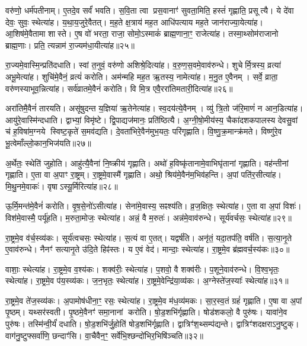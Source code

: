वरु॑णो॒ धर्म॑पतीनाम्।
ए॒तदे॒व सर्वं॑ भवति।
स॒वि॒ता त्वा प्रस॒वानाꣳ॑ सुवता॒मिति॒ हस्तं॑ गृह्णाति॒ प्रसूत्यै।
ये दे॑वा देवः॒ सुवः॒ स्थेत्या॑ह।
य॒था॒य॒जुरे॒वैतत्।
म॒ह॒ते क्ष॒त्राय॑ मह॒त आधि॑पत्याय मह॒ते जान॑राज्या॒येत्या॑ह।
आ॒शिष॑मे॒वैतामा शास्ते।
ए॒ष वो॑ भरता॒ राजा॒ सोमो॒\-ऽस्माकं॑ ब्राह्म॒णाना॒ꣳ॒ राजेत्या॑ह।
तस्मा॒थ्सोम॑राजानो ब्राह्म॒णाः।
प्रति॒ त्यन्नाम॑ रा॒ज्यम॑धा॒यीत्या॑ह॥२५॥

रा॒ज्यमे॒वास्मि॒न्प्रति॑दधाति।
स्वां त॒नुवं॒ वरु॑णो अशिश्रे॒दि\-त्या॑ह।
व॒रु॒ण॒स॒वमे॒वाव॑रुन्धे।
शुचेर्मि॒त्रस्य॒ व्रत्या॑ अभू॒मेत्या॑ह।
शुचि॑मे॒वैनं॒ व्रत्यं॑ करोति।
अम॑न्महि मह॒त ऋ॒तस्य॒ नामेत्या॑ह।
म॒नु॒त ए॒वैनम्।
सर्वे॒ व्राता॒ वरु॑णस्याभूव॒न्नित्या॑ह।
सर्व॑व्रातमे॒वैनं॑ करोति।
वि मि॒त्र एवै॒ररा॑तिमतारी॒दित्या॑ह॥२६॥

अरा॑तिमै॒वैनं॑ तारयति।
असू॑षुदन्त य॒ज्ञिया॑ ऋ॒तेनेत्या॑ह।
स्व॒दय॑त्ये॒वैनम्।
व्यु॑ त्रि॒तो ज॑रि॒माणं॑ न आन॒डित्या॑ह।
आयु॑रे॒वास्मि॑न्दधाति।
द्वाभ्यां॒ विमृ॑ष्टे।
द्वि॒पाद्यज॑मानः॒ प्रति॑ष्ठित्यै।
अ॒ग्नी॒षो॒मीय॑स्य॒ चैका॑दशकपालस्य देवसु॒वां च॑ ह॒विषा॑म॒ग्नये स्विष्ट॒कृते॑ स॒मव॑द्यति।
दे॒वता॑भिरे॒वैन॑मुभ॒यतः॒ परि॑गृह्णाति।
वि॒ष्णु॒क्र॒मान्क्र॑मते।
विष्णु॑रे॒व भू॒त्वेमाँल्लो॒कान॒भि\-ज॑यति॥२७॥\anuvakamend[स॒त्याना॑मधा॒यीत्या॑हातारी॒दित्या॑ह क्रमत॒ एकं॑ च]

अ॒र्थेतः॒ स्थेति॑ जुहोति।
आहु॑त्यै॒वैना॑ नि॒ष्क्रीय॑ गृह्णाति।
अथो॑ ह॒विष्कृ॑तानामे॒वाभिघृ॑तानां गृह्णाति।
वह॑न्तीनां गृह्णाति।
ए॒ता वा अ॒पाꣳ रा॒ष्ट्रम्।
रा॒ष्ट्रमे॒वास्मै॑ गृह्णाति।
अथो॒ श्रिय॑मे॒वैन॑म॒भिव॑हन्ति।
अ॒पां पति॑र॒सीत्या॑ह।
मि॒थु॒नमे॒वाकः॑।
वृषा\-ऽस्यू॒र्मिरित्या॑ह॥२८॥

ऊ॒र्मि॒मन्त॑मे॒वैनं॑ करोति।
वृ॒ष॒से॒नो॑\-ऽसीत्या॑ह।
सेना॑मे॒वास्य॒ सꣴश्य॑ति।
व्र॒ज॒क्षितः॒ स्थेत्या॑ह।
ए॒ता वा अ॒पां विशः॑।
विश॑मे॒वास्मै॒ पर्यू॑हति।
म॒रुता॒मोजः॒ स्थेत्या॑ह।
अन्नं॒ वै म॒रुतः॑।
अन्न॑मे॒वाव॑रुन्धे।
सूर्य॑वर्चसः॒ स्थेत्या॑ह॥२९॥

रा॒ष्ट्रमे॒व व॑र्च॒स्व्य॑कः।
सूर्य॑त्वचसः॒ स्थेत्या॑ह।
स॒त्यं वा ए॒तत्।
यद्वर्\mbox{}ष॑ति।
अनृ॑तं॒ यदा॒तप॑ति॒ वर्\mbox{}ष॑ति।
स॒त्या॒नृ॒ते ए॒वाव॑रुन्धे।
नैनꣳ॑ सत्यानृ॒ते उ॑दि॒ते हिꣴ॑स्तः।
य ए॒वं वेद॑।
मान्दाः॒ स्थेत्या॑ह।
रा॒ष्ट्रमे॒व ब्र॑ह्मवर्च॒स्य॑कः॥३०॥

वाशाः॒ स्थेत्या॑ह।
रा॒ष्ट्रमे॒व व॒श्य॑कः।
शक्व॑रीः॒ स्थेत्या॑ह।
प॒शवो॒ वै शक्व॑रीः।
प॒शूने॒वाव॑रुन्धे।
वि॒श्व॒भृतः॒ स्थेत्या॑ह।
रा॒ष्ट्रमे॒व प॑य॒स्व्य॑कः।
ज॒न॒भृतः॒ स्थेत्या॑ह।
रा॒ष्ट्रमे॒वेन्द्रि॑या॒व्य॑कः।
अ॒ग्नेस्ते॑ज॒स्याः᳚ स्थेत्या॑ह॥३१॥

रा॒ष्ट्रमे॒व ते॑ज॒स्व्य॑कः।
अ॒पामोष॑धीना॒ꣳ॒ रसः॒ स्थेत्या॑ह।
रा॒ष्ट्रमे॒व म॑ध॒व्य॑मकः।
सा॒र॒स्व॒तं ग्रहं॑ गृह्णाति।
ए॒षा वा अ॒पां पृ॒ष्ठम्।
यथ्सर॑स्वती।
पृ॒ष्ठमे॒वैनꣳ॑ समा॒नानां करोति।
षो॒ड॒शभि॑र्गृह्णाति।
षोड॑शकलो॒ वै पुरु॑षः।
यावा॑ने॒व पुरु॑षः।
तस्मि॑न्वी॒र्यं॑ दधाति।
षो॒ड॒शभि॑र्जु॒होति॑ षोड॒शभि॑र्गृह्णाति।
द्वात्रिꣳ॑श॒थ्सम्प॑द्यन्ते।
द्वात्रिꣳ॑शदक्षरा\-ऽनु॒ष्टुक्।
वाग॑नु॒ष्टुफ्सर्वा॑णि॒ छन्दाꣳ॑सि।
वा॒चैवैन॒ꣳ॒ सर्वे॑भि॒श्छन्दो॑भिर॒भिषि॑ञ्चति॥३२॥\anuvakamend[ऊ॒र्मिरित्या॑ह॒ सूर्य॑वर्चसः॒ स्थेत्या॑ह ब्रह्मवर्च॒स्य॑कस्तेज॒स्याः᳚ स्थेत्या॑है॒व पुरु॑षः॒ षट् च॑]

